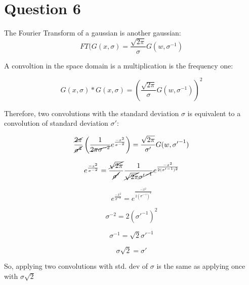 \section*{Question 6}
\noindent
The Fourier Transform of a gaussian is another gaussian:
\begin{equation}
 FT(G(x,\sigma) = \frac{\sqrt{2\pi}}{\sigma} G(w, \sigma^{-1})
\end{equation}

A convoltion in the space domain is a multiplication is the frequency one:

\begin{equation}
G(x,\sigma)*G(x,\sigma) =  \left( \frac{\sqrt{2\pi}}{\sigma} G(w, \sigma^{-1}) \right)  ^2
\end{equation}

Therefore, two convolutions with the standard deviation $\sigma$ is equivalent to a convolution of standard deviation $\sigma'$:

\begin{equation}
 \frac{\cancel{2\pi}}{\cancel{\sigma^2}} \left( \frac{1}{\cancel{2\pi\sigma^{-2}}} e^{\frac{-x^2}{\sigma^{-2}}}  \right) =  \frac{\sqrt{2\pi}}{\sigma'} G(w, {\sigma'}^{-1})
\end{equation}

\begin{equation}
 e^{\frac{-x^2}{\sigma^{-2}}} = \frac{\cancel{\sqrt{2\pi}}}{\cancel{\sigma'}} \frac{1}{\cancel{\sqrt{2\pi}}\cancel{{\sigma'}^{-1}}} e^{\frac{-x^2}{2({\sigma'}^{-1})^2}}
\end{equation}

\begin{equation}
 e^{\frac{-x^2}{\sigma^{-2}}} = e^{\frac{-x^2}{2 (   {{\sigma'}^{-1}  })^2     }}
\end{equation}

\begin{equation}
 \sigma^{-2} = 2 ({\sigma'}^{-1})^2
\end{equation}

\begin{equation}
 \sigma^{-1} = \sqrt{2} {\sigma'}^{-1}
\end{equation}

\begin{equation}
 \sigma\sqrt{2} = \sigma'
\end{equation}

So, applying two convolutions with std. dev of $\sigma$ is the same as applying once with $\sigma\sqrt{2}$